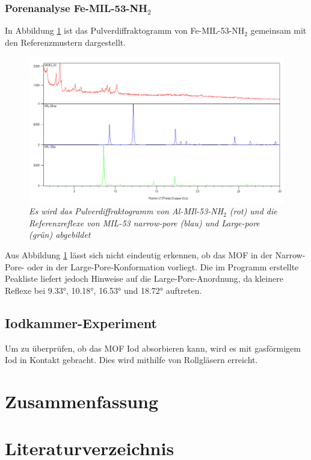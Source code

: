 \documentclass[12pt, a4paper]{article}
\begin{document}
\newpage

\subsubsection{\texorpdfstring{Porenanalyse Fe-MIL-53-NH$_2$}{Porenanalyse Fe-MIL-53-NH2}}
In Abbildung \ref{MOF220ver} ist das Pulverdiffraktogramm von Fe-MIL-53-NH$_2$ gemeinsam mit den Referenzmustern dargestellt. 

\begin{figure}[!h]
    \centering
    \includegraphics[scale=0.5]{MOF220ver.png}
    \caption{\textit{Es wird das Pulverdiffraktogramm von Al-MIl-53-NH$_2$ (rot) und die Referenzreflexe von MIL-53 narrow-pore (blau) und Large-pore (grün) abgebildet}}
    \label{MOF220ver}
\end{figure}
\noindent
Aus Abbildung \ref{MOF220ver} lässt sich nicht eindeutig erkennen, ob das MOF in der Narrow-Pore- oder in der Large-Pore-Konformation vorliegt. Die im Programm erstellte 
Peakliste liefert jedoch Hinweise auf die Large-Pore-Anordnung, da kleinere Reflexe bei 9.33°, 10.18°, 16.53° und 18.72° auftreten.
\newpage
\subsection{Iodkammer-Experiment}
Um zu überprüfen, ob das MOF Iod absorbieren kann, wird es mit gasförmigem Iod in Kontakt gebracht. Dies wird mithilfe von Rollgläsern erreicht.





\newpage
\section{Zusammenfassung}



\newpage
\section{Literaturverzeichnis}
\printbibliography
\end{document}
